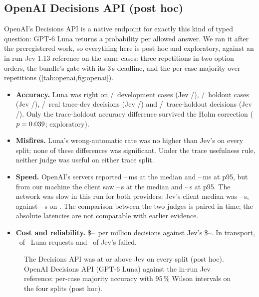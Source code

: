 \subsection{OpenAI Decisions API (post hoc)}\label{sec:openai}
OpenAI's Decisions API is a native endpoint for exactly this kind of typed question: GPT-6 Luna returns a probability per
allowed answer. We ran it after the preregistered work, so everything here is post hoc and exploratory, against an
in-run Jev 1.13 reference on the same cases: three repetitions in two option orders, the bundle's gate with its
3\,s deadline, and the per-case majority over repetitions (\cref{tab:openai,fig:openai}).
\begin{itemize}
  \item \textbf{Accuracy.} Luna was right on \OaDevLunaK/\OaDevLunaN\ development cases (Jev \OaDevJevK/\OaDevJevN),
    \OaHoldoutLunaK/\OaHoldoutLunaN\ holdout cases (Jev \OaHoldoutJevK/\OaHoldoutJevN), \OaTraceDevLunaK/\OaTraceDevLunaN\
    real trace-dev decisions (Jev \OaTraceDevJevK/\OaTraceDevJevN) and \OaTraceHoldoutLunaK/\OaTraceHoldoutLunaN\
    trace-holdout decisions (Jev \OaTraceHoldoutJevK/\OaTraceHoldoutJevN). Only the trace-holdout accuracy difference
    survived the Holm correction ($p = 0.039$; exploratory).
  \item \textbf{Misfires.} Luna's wrong-automatic rate was no higher than Jev's on every split; none of these differences
    was significant. Under the trace usefulness rule, neither judge was useful on either trace split.
  \item \textbf{Speed.} OpenAI's servers reported \OaServerPfiftyLo--\OaServerPfiftyHi\,ms at the median and
    \OaServerPninetyfiveLo--\OaServerPninetyfiveHi\,ms at p95, but from our machine the client saw
    \OaClientPfiftyLo--\OaClientPfiftyHi\,s at the median and \OaClientPninetyfiveLo--\OaClientPninetyfiveHi\,s at p95.
    The network was slow in this run for both providers: Jev's client median was \OaJevClientLo--\OaJevClientHi\,s,
    against \OaJevEarlierLo--\OaJevEarlierHi\,s on \OaJevEarlierDate. The comparison between the two judges is paired in
    time; the absolute latencies are not comparable with earlier evidence.
  \item \textbf{Cost and reliability.} \$\OaUsdLo--\OaUsdHi\ per million decisions against Jev's \$\OaJevUsdLo--\OaJevUsdHi.
    In transport, \OaInvalid\ of \OaRequests\ Luna requests and \OaInvalidJev\ of Jev's failed.
\end{itemize}
\begin{figure}[htbp]
\centering
{}\par\smallskip

\caption{The Decisions API was at or above Jev on every split (post hoc). OpenAI Decisions API (GPT-6 Luna) against the in-run Jev reference: per-case majority accuracy with 95\,\%
Wilson intervals on the four splits (post hoc).}
\label{fig:openai}
\end{figure}
